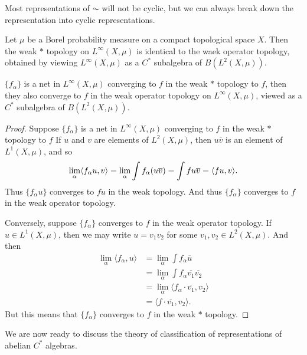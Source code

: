 Most representations of $\AC$ will not be cyclic, but we can always break down the representation into cyclic representations.

\begin{lemma}
    Let $\mu$ be a Borel probability measure on a compact topological space $X$. Then the weak $*$ topology on $L^\infty(X,\mu)$ is identical to the waek operator topology, obtained by viewing $L^\infty(X,\mu)$ as a $C^*$ subalgebra of $B(L^2(X,\mu))$.

     $\{ f_\alpha \}$ is a net in $L^\infty(X,\mu)$ converging to $f$ in the weak $*$ topology to $f$, then they also converge to $f$ in the weak operator topology on $L^\infty(X,\mu)$, viewed as a $C^*$ subalgebra of $B(L^2(X,\mu))$.
\end{lemma}
\begin{proof}
    Suppose $\{ f_\alpha \}$ is a net in $L^\infty(X,\mu)$ converging to $f$ in the weak $*$ topology to $f$ If $u$ and $v$ are elements of $L^2(X,\mu)$, then $u \overline{v}$ is an element of $L^1(X,\mu)$, and so
    \[ \lim_\alpha \langle f_\alpha u, v \rangle = \lim_\alpha \int f_\alpha (u \overline{v}) = \int f u \overline{v} = \langle fu, v \rangle. \qedhere \]
    Thus $\{ f_\alpha u \}$ converges to $fu$ in the weak topology. And thus $\{ f_\alpha \}$ converges to $f$ in the weak operator topology.

    Conversely, suppose $\{ f_\alpha \}$ converges to $f$ in the weak operator topology. If $u \in L^1(X,\mu)$, then we may write $u = v_1 v_2$ for some $v_1, v_2 \in L^2(X,\mu)$. And then
    \begin{align*}
        \lim_\alpha \langle f_\alpha, u \rangle &= \lim_\alpha \int f_\alpha \overline{u}\\
        &= \lim_\alpha \int f_\alpha \overline{v_1} \overline{v_2}\\
        &= \lim_\alpha \langle f_\alpha \cdot \overline{v_1}, v_2 \rangle\\
        &= \langle f \cdot \overline{v_1}, v_2 \rangle.
    \end{align*}
    But this means that $\{ f_\alpha \}$ converges to $f$ in the weak $*$ topology.
\end{proof}

We are now ready to discuss the theory of classification of representations of abelian $C^*$ algebras.

